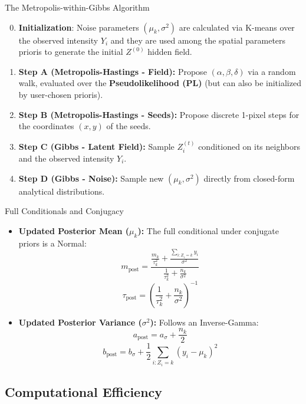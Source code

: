 \documentclass[
  ignorenonframetext,
]{beamer}
\providecommand{\tightlist}{%
  \setlength{\itemsep}{0pt}\setlength{\parskip}{0pt}}\usepackage{longtable,booktabs,array}
\begin{document}
\begin{frame}{The Metropolis-within-Gibbs Algorithm}
\label{the-metropolis-within-gibbs-algorithm}
\begin{enumerate}
\setcounter{enumi}{-1}
\tightlist
\item
  \textbf{Initialization}: Noise parameters \((\mu_k, \sigma^2)\) are
  calculated via K-means over the observed intensity \(Y_i\) and they
  are used among the spatial parameters prioris to generate the initial
  \(Z^{(0)}\) hidden field.
\item
  \textbf{Step A (Metropolis-Hastings - Field):} Propose
  \((\alpha, \beta, \delta)\) via a random walk, evaluated over the
  \textbf{Pseudolikelihood (PL)} (but can also be initialized by
  user-chosen prioris).
\item
  \textbf{Step B (Metropolis-Hastings - Seeds):} Propose discrete
  1-pixel steps for the coordinates \((x,y)\) of the seeds.
\item
  \textbf{Step C (Gibbs - Latent Field):} Sample \(Z_i^{(t)}\)
  conditioned on its neighbors and the observed intensity \(Y_i\).
\item
  \textbf{Step D (Gibbs - Noise):} Sample new \((\mu_k, \sigma^2)\)
  directly from closed-form analytical distributions.
\end{enumerate}
\end{frame}

\begin{frame}{Full Conditionals and Conjugacy}
\label{full-conditionals-and-conjugacy}
\begin{itemize}
\tightlist
\item
  \textbf{Updated Posterior Mean (\(\mu_k\)):} The full conditional
  under conjugate priors is a Normal:
  \[m_{\text{post}} = \frac{\frac{m_k}{\tau^2_k} + \frac{\sum_{i: Z_i=k} y_i}{\sigma^2}}{\frac{1}{\tau^2_k} + \frac{n_k}{\sigma^2}}\]
  \[\tau_{\text{post}} = \left(\frac{1}{\tau^2_k} + \frac{n_k}{\sigma^2}\right)^{-1}\]
\item
  \textbf{Updated Posterior Variance (\(\sigma^2\)):} Follows an
  Inverse-Gamma: \[a_{\text{post}} = a_\sigma + \frac{n_k}{2}\]
  \[b_{\text{post}} = b_\sigma + \frac{1}{2} \sum_{i: Z_i=k} (y_i - \mu_k)^2\]
\end{itemize}
\end{frame}

\subsection{Computational Efficiency}\label{computational-efficiency}
\end{document}
